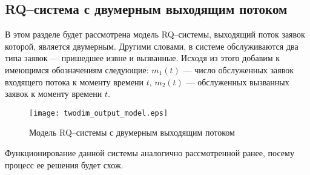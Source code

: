 \subsection{RQ--система с двумерным выходящим потоком} \label{section_simple_twodim}
В этом разделе будет рассмотрена модель RQ--системы, выходящий поток заявок которой, является двумерным. Другими словами, в системе обслуживаются два типа заявок --- пришедшее извне и вызванные. Исходя из этого добавим к имеющимся обозначениям следующие: \textit{$m_{1}(t)$} --- число обслуженных заявок входящего потока к моменту времени $\textit{t}$, \textit{$m_{2}(t)$} — обслуженных вызванных заявок к моменту времени $\textit{t}$.
\begin{figure}[H]
	\centering
	\texttt{[image: twodim\_output\_model.eps]}
	\caption{Модель RQ--системы с двумерным выходящим потоком}
	\label{twodim_output_model_fig}
\end{figure}
Функционирование данной системы аналогично рассмотренной ранее, посему процесс ее решения будет схож. 
